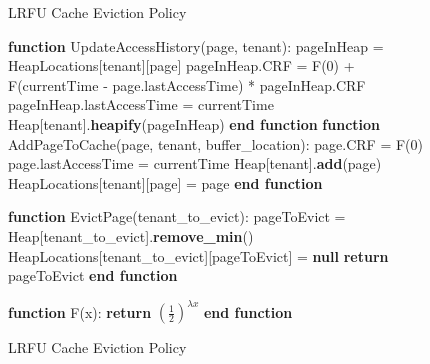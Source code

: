 \begin{figure}[htbp]
    \centering
    \begin{minipage}{\linewidth}
    \begin{algorithm}[H]
        \caption{LRFU Cache Eviction Policy}
        \begin{algorithmic}
            \STATE \textbf{function} UpdateAccessHistory(page, tenant):
            \STATE \hspace{\algorithmicindent} pageInHeap = HeapLocations[tenant][page]
            \STATE \hspace{\algorithmicindent} pageInHeap.CRF = F(0) + F(currentTime - page.lastAccessTime) * pageInHeap.CRF
            \STATE \hspace{\algorithmicindent} pageInHeap.lastAccessTime = currentTime
            \STATE \hspace{\algorithmicindent} Heap[tenant].\textbf{heapify}(pageInHeap)
            \STATE \textbf{end function}
            \STATE
            \STATE \textbf{function} AddPageToCache(page, tenant, buffer\_location):
            \STATE \hspace{\algorithmicindent} page.CRF = F(0)
            \STATE \hspace{\algorithmicindent} page.lastAccessTime = currentTime
            \STATE \hspace{\algorithmicindent} Heap[tenant].\textbf{add}(page)
            \STATE \hspace{\algorithmicindent} HeapLocations[tenant][page] = page
            \STATE \textbf{end function}

            \STATE
            \STATE \textbf{function} EvictPage(tenant\_to\_evict):
            \STATE \hspace{\algorithmicindent} pageToEvict = Heap[tenant\_to\_evict].\textbf{remove\_min}()
            \STATE \hspace{\algorithmicindent} HeapLocations[tenant\_to\_evict][pageToEvict] = \textbf{null}
            \STATE \hspace{\algorithmicindent} \textbf{return} pageToEvict
            \STATE \textbf{end function}

            \STATE
            \STATE \textbf{function} F(x):
            \STATE \hspace{\algorithmicindent} \textbf{return} $(\frac{1}{2})^{\lambda x}$
            \STATE \textbf{end function}
        \end{algorithmic}
    \end{algorithm}
    \caption{LRFU Cache Eviction Policy}
    \label{fig:lrfu}
    \end{minipage}
\end{figure}

